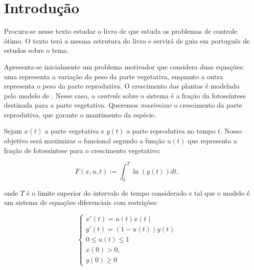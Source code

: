 \section{Introdução}

Procura-se nesse texto estudar o livro de \cite{lenhart2007} que estuda os
problemas de controle ótimo. O texto terá a mesma estrutura do livro e servirá
de guia em português de estudos sobre o tema. 

\begin{example}
    Apresenta-se inicialmente um problema motivador que considera duas equações: uma
    representa a variação do peso da parte vegetativa, enquanto a outra representa
    o peso da parte reprodutiva. O crescimento das plantas é modelado pelo modelo
    de \cite{cohen1971299}. Nesse caso, o \textit{controle} sobre o sistema é a fração
    da fotossíntese destinada para a parte vegetativa. Queremos \textit{maximizar} o 
    crescimento da parte reprodutiva, que garante o mantimento da espécie. 

    Sejam $x(t)$ a parte vegetativa e $y(t)$ a parte reprodutiva no
    tempo $t$. Nosso objetivo será maximizar o funcional 
    segundo a função $u(t)$ que representa a fração de fotossíntese para
    o crescimento vegetativo: 

    \begin{equation}
        \label{funcional-maximize}
        F(x,u,t) := \int_0^T \ln(y(t))dt, 
    \end{equation}

    onde $T$ é o limite superior do intervalo de tempo considerado e tal que o
    modelo é um sistema de equações diferenciais com restrições: 

    \begin{equation}
        \begin{cases}
            x'(t) = u(t)x(t) \\
            y'(t) = (1 - u(t))y(t) \\
            0 \leq u(t) \leq 1 \\
            x(0) > 0, \\
            y(0) \geq 0
        \end{cases}    
    \end{equation}
\end{example}

